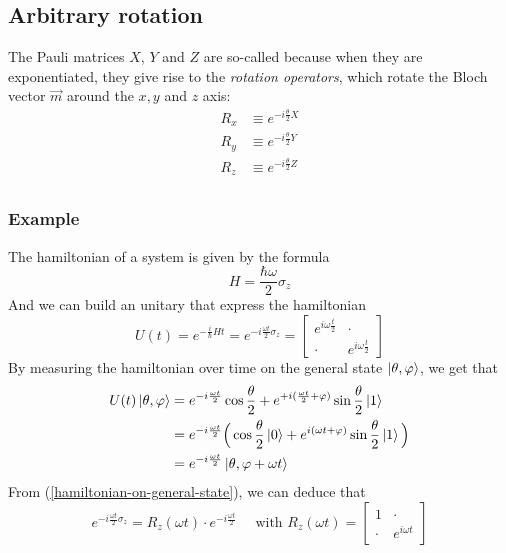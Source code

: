 \documentclass{article}
\begin{document}
\subsection{Arbitrary rotation}
The Pauli matrices $X$, $Y$ and $Z$ are so-called because when they are exponentiated,
they give rise to the \textit{rotation operators}, which rotate the Bloch vector $\vec{m}$
around the $x, y$ and $z$ axis:
\begin{equation}
    \begin{aligned}
        R_x & \equiv e^{-i\frac{\theta}{2}X} \\
        R_y & \equiv e^{-i\frac{\theta}{2}Y} \\
        R_z & \equiv e^{-i\frac{\theta}{2}Z} \\
    \end{aligned}
\end{equation}


\subsubsection*{Example}
The hamiltonian of a system is given by the formula
\begin{equation}
        H=\frac{\hbar\omega}{2}\sigma_z
\end{equation}
And we can build an unitary that express the hamiltonian
\begin{equation}
    U(t) = e^{-\frac{i}{\hbar}Ht}=e^{-i\frac{\omega t}{2}\sigma_z}
    = \begin{bmatrix}
        e^{i\omega\frac{t}{2}} & \cdot \\ \cdot & e^{i\omega\frac{t}{2}}
    \end{bmatrix}
\end{equation}
By measuring the hamiltonian over time on the general state $\ket{\theta, \varphi}$,
we get that
\begin{equation}
    \label{hamiltonian-on-general-state}
    \begin{aligned}
        U(t)\ket{\theta, \varphi}
            & = e^{-i\frac{\omega t}{2}}\cos\frac{\theta}{2} +
                e^{+i(\frac{\omega t}{2}+\varphi)}\sin\frac{\theta}{2}\ket{1} \\
            & = e^{-i\frac{\omega t}{2}}\Big(\cos\frac{\theta}{2}\ket{0} +
                e^{i(\omega t + \varphi)}\sin\frac{\theta}{2}\ket{1}\Big) \\
            & = e^{-i\frac{\omega t}{2}}\ket{\theta, \varphi + \omega t}    \end{aligned}
\end{equation}
From (\ref{hamiltonian-on-general-state}), we can deduce that
\begin{equation}
    e^{-i\frac{\omega t}{2}\sigma_z}=R_z(\omega t)\cdot e^{-i\frac{\omega t}{2}}
    \quad \text{ with } R_z(\omega t) = \begin{bmatrix}
        1 & \cdot \\ \cdot & e^{i\omega t}
    \end{bmatrix}
\end{equation}
\end{document}
